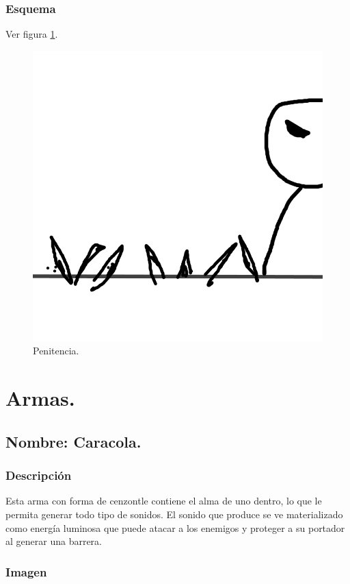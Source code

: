 \documentclass[11pt,letterpaper]{article}
\begin{document}
\subsubsection{Esquema}
			Ver figura \ref{fig:penitencia}.
			\begin{figure}
				\centering
				\includegraphics[height=0.2 \textheight]{Imagenes/penitencia}
				\caption{Penitencia.}
				\label{fig:penitencia}
			\end{figure}


\section{Armas.}
\subsection{Nombre: Caracola.}
\subsubsection{Descripción}
Esta arma con forma de cenzontle contiene el alma de uno dentro, lo que le permita generar todo tipo de sonidos. El sonido que produce se ve materializado como energía luminosa que puede atacar a los enemigos y proteger a su portador al generar una barrera.
\subsubsection{Imagen}
\end{document}
